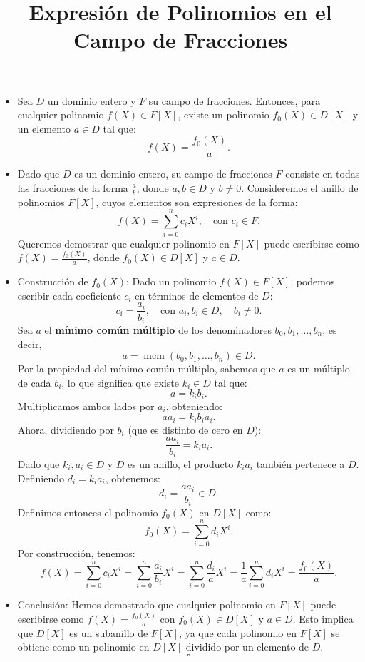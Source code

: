 \documentclass{article}
\begin{document}
\title{Expresión de Polinomios en el Campo de Fracciones}
\author{}
\date{}
\maketitle

\begin{itemize}
    \item Sea $D$ un dominio entero y $F$ su campo de fracciones. Entonces, para cualquier polinomio $f(X) \in F[X]$, existe un polinomio $f_0(X) \in D[X]$ y un elemento $a \in D$ tal que:
    \[
    f(X) = \frac{f_0(X)}{a}.
    \]

    \item Dado que $D$ es un dominio entero, su campo de fracciones $F$ consiste en todas las fracciones de la forma $\frac{a}{b}$, donde $a, b \in D$ y $b \neq 0$. Consideremos el anillo de polinomios $F[X]$, cuyos elementos son expresiones de la forma:
    \[
    f(X) = \sum_{i=0}^{n} c_i X^i, \quad \text{con } c_i \in F.
    \]
    Queremos demostrar que cualquier polinomio en $F[X]$ puede escribirse como $f(X) = \frac{f_0(X)}{a}$, donde $f_0(X) \in D[X]$ y $a \in D$.

    \item Construcción de $f_0(X)$: Dado un polinomio $f(X) \in F[X]$, podemos escribir cada coeficiente $c_i$ en términos de elementos de $D$:
    \[
    c_i = \frac{a_i}{b_i}, \quad \text{con } a_i, b_i \in D, \quad b_i \neq 0.
    \]
    Sea $a$ el \textbf{mínimo común múltiplo} de los denominadores $b_0, b_1, \dots, b_n$, es decir,
    \[
    a = \operatorname{mcm}(b_0, b_1, \dots, b_n) \in D.
    \]
    Por la propiedad del mínimo común múltiplo, sabemos que $a$ es un múltiplo de cada $b_i$, lo que significa que existe $k_i \in D$ tal que:
    \[
    a = k_i b_i.
    \]
    Multiplicamos ambos lados por $a_i$, obteniendo:
    \[
    a a_i = k_i b_i a_i.
    \]
    Ahora, dividiendo por $b_i$ (que es distinto de cero en $D$):
    \[
    \frac{a a_i}{b_i} = k_i a_i.
    \]
    Dado que $k_i, a_i \in D$ y $D$ es un anillo, el producto $k_i a_i$ también pertenece a $D$. Definiendo $d_i = k_i a_i$, obtenemos:
    \[
    d_i = \frac{a a_i}{b_i} \in D.
    \]
    Definimos entonces el polinomio $f_0(X)$ en $D[X]$ como:
    \[
    f_0(X) = \sum_{i=0}^{n} d_i X^i.
    \]
    Por construcción, tenemos:
    \[
    f(X) = \sum_{i=0}^{n} c_i X^i = \sum_{i=0}^{n} \frac{a_i}{b_i} X^i = \sum_{i=0}^{n} \frac{d_i}{a} X^i = \frac{1}{a} \sum_{i=0}^{n} d_i X^i = \frac{f_0(X)}{a}.
    \]

    \item Conclusión: Hemos demostrado que cualquier polinomio en $F[X]$ puede escribirse como $f(X) = \frac{f_0(X)}{a}$ con $f_0(X) \in D[X]$ y $a \in D$. Esto implica que $D[X]$ es un subanillo de $F[X]$, ya que cada polinomio en $F[X]$ se obtiene como un polinomio en $D[X]$ dividido por un elemento de $D$.
    \[
    \square
    \]
\end{itemize}
\end{document}
